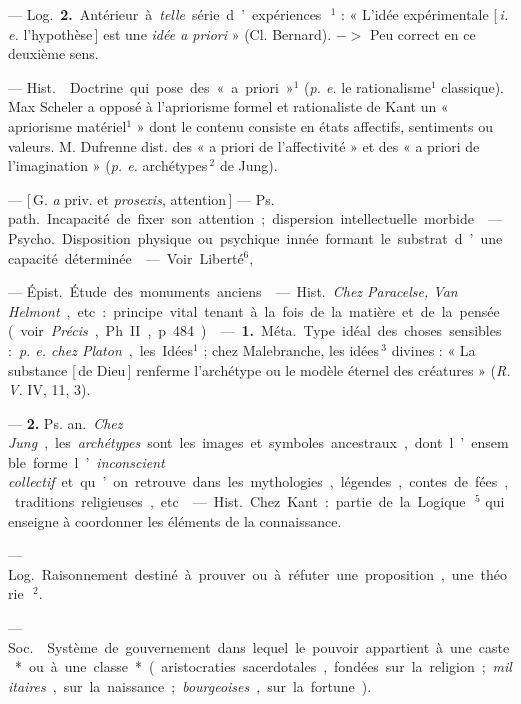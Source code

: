 \begin{itemize}[leftmargin=1cm, label=, itemsep=1pt]
{{— \si{Log.} {\bf 2.} Antérieur à {\it telle} série
d’expériences\,$^1$ : « L'idée expérimentale [\,{\it i. e.} l'hypothèse\,] est une {\it idée
a priori} » (Cl. Bernard). $->$ Peu
correct en ce deuxième sens.

 — \si{Hist.}  Doctrine qui
pose des « a priori »$^1$ ({\it p. e.} le rationalisme$^1$ classique). Max Scheler a
opposé à l’apriorisme formel et rationaliste de Kant un « apriorisme
matériel$^1$ » dont le contenu consiste
en états affectifs, sentiments ou
valeurs. M. Dufrenne dist. des « a
priori de l’affectivité » et des « a
priori de l'imagination » ({\it p. e.} archétypes\,$^2$ de Jung).

 — [\,G. {\it a} priv. et {\it prosexis}, attention\,] — \si{Ps. path.} Incapacité de
fixer son attention; dispersion intellectuelle morbide.

 — \si{Psycho.} Disposition physique ou psychique innée formant le
substrat d’une capacité déterminée.

 — Voir Liberté$^6$,

 — \si{Épist.} Étude des monuments anciens.

 — \si{Hist.} {\it Chez Paracelse, Van
Helmont}, etc. : principe vital tenant
à la fois de la matière et de la pensée
(voir {\it Précis}, Ph. II, p. 484).

 — {\bf 1.} \si{Méta.} Type idéal des
choses sensibles : {\it p. e. chez Platon},
les Idées$^1$ ; chez Malebranche, les
idées\,$^3$ divines : « La substance [\,de
Dieu\,] renferme l’archétype ou le
modèle éternel des créatures » ({\it R. V.}
IV, 11, 3).

— {\bf 2.} \si{Ps. an.} {\it Chez Jung}, les {\it archétypes} sont les images et symboles
ancestraux, dont l’ensemble forme
l’{\it inconscient collectif} et qu’on retrouve dans les mythologies,
légendes, contes de fées, traditions religieuses, etc.

 — \si{Hist.} Chez Kant :
partie de la Logique\,$^5$ qui enseigne à
coordonner les éléments de la connaissance.

 — \si{Log.} Raisonnement destiné à prouver ou à réfuter une
proposition, une théorie\,$^2$.

 — \si{Soc.}  Système de
gouvernement dans lequel le pouvoir appartient à une caste* ou à une
classe* (aristocraties sacerdotales,
fondées sur la religion; {\it militaires},
sur la naissance ; {\it bourgeoises}, sur la
fortune).

}}
\end{itemize}
